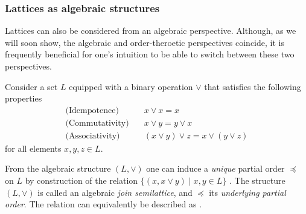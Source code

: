 \subsubsection{Lattices as algebraic structures}
\label{subsubsection:lattices-as-algebraic-structures}

Lattices can also be considered from an algebraic perspective. Although, as we will soon show, the algebraic and order-theroetic
perspectives coincide, it is frequently beneficial for one's intuition to be able to switch between these two perspectives.

Consider a set $L$ equipped with a binary operation $\vee$ that satisfies the following properties
%
\begin{align}
	\text{(Idempotence)}   & \quad x \vee x = x \label{eq:idempotence}                            \\
	\text{(Commutativity)} & \quad x \vee y = y \vee x \label{eq:commutativity}                   \\
	\text{(Associativity)} & \quad (x \vee y) \vee z = x \vee (y \vee z) \label{eq:associativity}
\end{align}
for all elements $x,y,z \in L$.

From the algebraic structure $(L, \vee)$ one can induce a \textit{unique} partial order $\preceq$ on $L$ by construction
of the relation $\{( x, x \vee y) \mid x,y \in L \}$ \cite{bergman2015invitation}. The structure $(L, \vee)$ is called an
algebraic \textit{join semilattice}, and $\preceq$ its \textit{underlying partial order}. The relation can equivalently be
described as .

